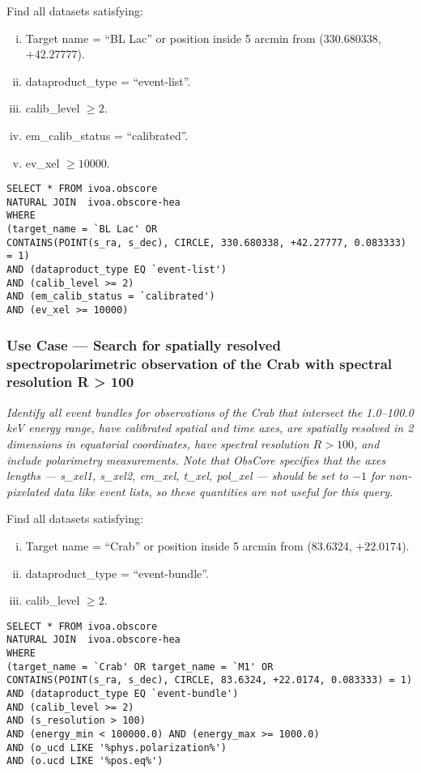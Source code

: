 \medskip
\noindent Find all datasets satisfying:
\begin{enumerate}[(i)]
  \item Target name = ``BL Lac'' or position inside 5 arcmin from (330.680338, $+42.27777$).
  \item dataproduct\_type = ``event-list''.
  \item calib\_level $\geq 2$.
  \item em\_calib\_status = ``calibrated''.
  \item ev\_xel $\geq 10000$.
\end{enumerate}

\begin{verbatim}
SELECT * FROM ivoa.obscore
NATURAL JOIN  ivoa.obscore-hea 
WHERE
(target_name = `BL Lac' OR
CONTAINS(POINT(s_ra, s_dec), CIRCLE, 330.680338, +42.27777, 0.083333) = 1) 
AND (dataproduct_type EQ `event-list')
AND (calib_level >= 2)
AND (em_calib_status = `calibrated')
AND (ev_xel >= 10000)
\end{verbatim}


\subsubsection{Use Case --- Search for spatially resolved spectropolarimetric observation of the Crab with spectral resolution R > 100}

{\em Identify all event bundles for observations of the Crab that intersect the 1.0--100.0 keV energy range, have calibrated spatial and time axes, are spatially resolved in 2 dimensions in equatorial coordinates, have spectral resolution $R>100$, and include polarimetry measurements.  Note that ObsCore specifies that the axes lengths --- s\_xel1, s\_xel2, em\_xel, t\_xel, pol\_xel --- should be set to $-1$ for non-pixelated data like event lists, so these quantities are not useful for this query.\/}

\medskip
\noindent Find all datasets satisfying:
\begin{enumerate}[(i)]
  \item Target name = ``Crab'' or position inside 5 arcmin from (83.6324, $+22.0174$).
  \item dataproduct\_type = ``event-bundle''.
  \item calib\_level $\geq 2$.
\end{enumerate}

\begin{verbatim}
SELECT * FROM ivoa.obscore
NATURAL JOIN  ivoa.obscore-hea 
WHERE
(target_name = `Crab' OR target_name = `M1' OR
CONTAINS(POINT(s_ra, s_dec), CIRCLE, 83.6324, +22.0174, 0.083333) = 1) 
AND (dataproduct_type EQ `event-bundle')
AND (calib_level >= 2)
AND (s_resolution > 100)
AND (energy_min < 100000.0) AND (energy_max >= 1000.0)
AND (o_ucd LIKE '%phys.polarization%')
AND (o.ucd LIKE '%pos.eq%')
\end{verbatim}



